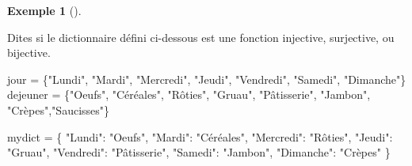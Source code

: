 \documentclass[
  letterpaper,
]{scrbook}
\newenvironment{Shaded}{\begin{snugshade}}{\end{snugshade}}
\newcommand{\NormalTok}[1]{\textcolor[rgb]{0.00,0.44,0.13}{#1}}
\newcommand{\OperatorTok}[1]{\textcolor[rgb]{0.40,0.40,0.40}{#1}}
\newcommand{\StringTok}[1]{\textcolor[rgb]{0.25,0.44,0.63}{#1}}
\theoremstyle{plain}
\theoremstyle{definition}
\theoremstyle{definition}
\newtheorem{example}{Exemple}[chapter]
\theoremstyle{remark}
\begin{document}
\begin{example}[]\protect\hypertarget{exm-jour-dejeuner-injective}{}\label{exm-jour-dejeuner-injective}

Dites si le dictionnaire défini ci-dessous est une fonction injective,
surjective, ou bijective.

\hypertarget{dictionnaries-days-breakfast-injective}{}
\begin{Shaded}
\begin{Highlighting}[]
\NormalTok{jour }\OperatorTok{=}\NormalTok{ \{}\StringTok{"Lundi"}\NormalTok{, }\StringTok{"Mardi"}\NormalTok{, }\StringTok{"Mercredi"}\NormalTok{, }\StringTok{"Jeudi"}\NormalTok{, }\StringTok{"Vendredi"}\NormalTok{, }\StringTok{"Samedi"}\NormalTok{, }\StringTok{"Dimanche"}\NormalTok{\}}
\NormalTok{dejeuner }\OperatorTok{=}\NormalTok{ \{}\StringTok{"Oeufs"}\NormalTok{, }\StringTok{"Céréales"}\NormalTok{, }\StringTok{"Rôties"}\NormalTok{, }\StringTok{"Gruau"}\NormalTok{, }\StringTok{"Pâtisserie"}\NormalTok{, }\StringTok{"Jambon"}\NormalTok{, }\StringTok{"Crèpes"}\NormalTok{,}\StringTok{"Saucisses"}\NormalTok{\}}

\NormalTok{mydict }\OperatorTok{=}\NormalTok{ \{}
    \StringTok{"Lundi"}\NormalTok{: }\StringTok{"Oeufs"}\NormalTok{,}
    \StringTok{"Mardi"}\NormalTok{: }\StringTok{"Céréales"}\NormalTok{,}
    \StringTok{"Mercredi"}\NormalTok{: }\StringTok{"Rôties"}\NormalTok{,}
    \StringTok{"Jeudi"}\NormalTok{: }\StringTok{"Gruau"}\NormalTok{,}
    \StringTok{"Vendredi"}\NormalTok{: }\StringTok{"Pâtisserie"}\NormalTok{,}
    \StringTok{"Samedi"}\NormalTok{: }\StringTok{"Jambon"}\NormalTok{,}
    \StringTok{"Dimanche"}\NormalTok{: }\StringTok{"Crèpes"}
\NormalTok{\}}
\end{Highlighting}
\end{Shaded}

\end{example}
\end{document}
